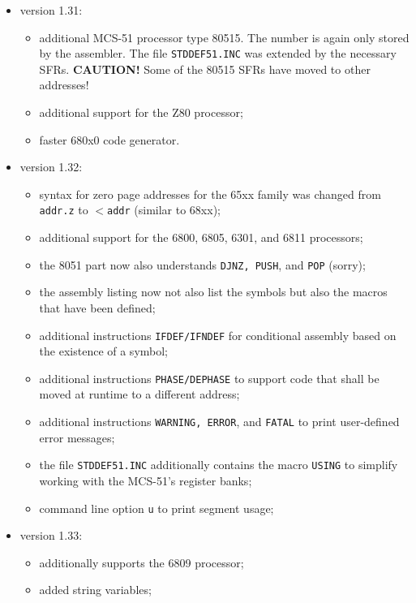 \documentclass[12pt,twoside]{report}
\newcommand{\bb}[1]{{\bf #1}}
\newcommand{\tty}[1]{{\tt #1}}
\begin{document}
\begin{itemize}
\item{version 1.31:
      \begin{itemize}
      \item{additional MCS-51 processor type 80515.  The number
            is again only stored by the assembler.  The file
            \tty{STDDEF51.INC} was extended by the necessary SFRs.
            \bb{CAUTION!} Some of the 80515 SFRs have moved to other
            addresses!}
      \item{additional support for the Z80 processor;}
      \item{faster 680x0 code generator.}
      \end{itemize}}
\item{version 1.32:
      \begin{itemize}
      \item{syntax for zero page addresses for the 65xx family
            was changed from \tty{addr.z} to \tty{$<$addr} (similar to 68xx);}
      \item{additional support for the 6800, 6805, 6301, and
            6811 processors;}
      \item{the 8051 part now also understands \tty{DJNZ, PUSH}, and
            \tty{POP} (sorry);}
      \item{the assembly listing now not also list the symbols
            but also the macros that have been defined;}
      \item{additional instructions \tty{IFDEF/IFNDEF} for conditional
            assembly based on the existence of a symbol;}
      \item{additional instructions \tty{PHASE/DEPHASE} to support code
            that shall be moved at runtime to a different address;}
      \item{additional instructions \tty{WARNING, ERROR}, and \tty{FATAL} to print
            user-defined error messages;}
      \item{the file \tty{STDDEF51.INC} additionally contains the macro
            \tty{USING} to simplify working with the MCS-51's register
            banks;}
      \item{command line option \tty{u} to print segment usage;}
      \end{itemize}}
\item{version 1.33:
      \begin{itemize}
      \item{additionally supports the 6809 processor;}
      \item{added string variables;}

\end{itemize}}
\end{itemize}
\end{document}

